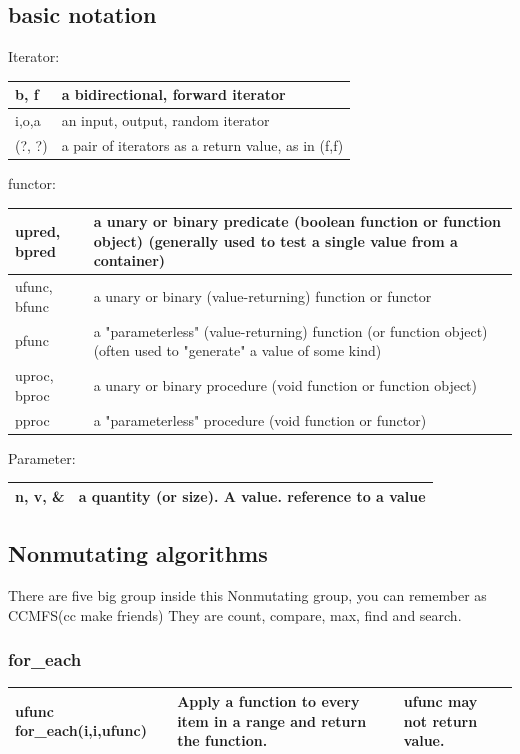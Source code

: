 \documentclass[a4paper,11pt,twoside]{book}
\newcommand{\tophline}{\hline }
\newcommand{\bottomhline}{\\ \hline }
\newcommand{\tophline}{ }
\newcommand{\bottomhline}{ }
\begin{document}
\subsection{basic notation}

Iterator:  \\
\begin{tabular}{| p{} |p{}|}
\tophline b, f &	a bidirectional, forward iterator \\
\tophline i,o,a 	&an input, output, random iterator  \\
\tophline(?, ?)	&a pair of iterators as a return value, as in (f,f) \bottomhline
\end{tabular}

functor:  \\
\begin{tabular}{| p{} |p{}|}
\tophline upred, bpred	& a unary or binary predicate (boolean function or function object)
(generally used to test a single value from a container) \\

\tophline ufunc, bfunc	&  a unary or binary  (value-returning) function or functor \\
\tophline pfunc	& a "parameterless" (value-returning) function (or function object)
(often used to "generate" a value of some kind) \\
\tophline uproc, bproc	& a unary or binary  procedure (void function or function object) \\
\tophline pproc	&  a "parameterless" procedure (void function or functor) \bottomhline
\end{tabular}

Parameter:  \\
\begin{tabular}{| p{} |p{}|}
\tophline n, v, \&  & 	a quantity (or size). A value. reference to a value \bottomhline
\end{tabular}

\subsection{Nonmutating algorithms}
There are five big group inside this Nonmutating group, you can remember as CCMFS(cc make friends) They are count, compare, max, find and search.

\subsubsection{for\_each}
\begin{tabular}{| p{} |p{}|p{}|}
\tophline ufunc for\_each(i,i,ufunc) &Apply a function to every item in a range and return the function. &  ufunc may not return value. 
\bottomhline
\end{tabular}
\newline 
\end{document}

